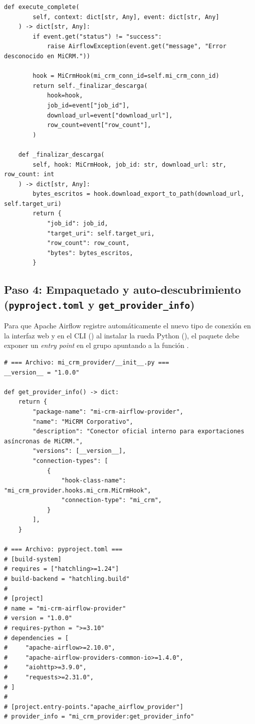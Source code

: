 \begin{lstlisting}[style=python, caption={Operador diferible (\texttt{mi\_crm\_provider/operators/mi\_crm.py}).}, label={lst:custom-operator}]
    def execute_complete(
        self, context: dict[str, Any], event: dict[str, Any]
    ) -> dict[str, Any]:
        if event.get("status") != "success":
            raise AirflowException(event.get("message", "Error desconocido en MiCRM."))

        hook = MiCrmHook(mi_crm_conn_id=self.mi_crm_conn_id)
        return self._finalizar_descarga(
            hook=hook,
            job_id=event["job_id"],
            download_url=event["download_url"],
            row_count=event["row_count"],
        )

    def _finalizar_descarga(
        self, hook: MiCrmHook, job_id: str, download_url: str, row_count: int
    ) -> dict[str, Any]:
        bytes_escritos = hook.download_export_to_path(download_url, self.target_uri)
        return {
            "job_id": job_id,
            "target_uri": self.target_uri,
            "row_count": row_count,
            "bytes": bytes_escritos,
        }
\end{lstlisting}

\subsection{Paso 4: Empaquetado y auto-descubrimiento (\texttt{pyproject.toml} y \texttt{get\_provider\_info})}

Para que Apache Airflow registre automáticamente el nuevo tipo de conexión  en la interfaz web y en el CLI () al instalar la rueda Python (), el paquete debe exponer un \textit{entry point} en el grupo  apuntando a la función .

\begin{lstlisting}[style=python, caption={Registro del proveedor (\texttt{mi\_crm\_provider/\_\_init\_\_.py}) y manifiesto \texttt{pyproject.toml}.}, label={lst:custom-packaging}]
# === Archivo: mi_crm_provider/__init__.py ===
__version__ = "1.0.0"

def get_provider_info() -> dict:
    return {
        "package-name": "mi-crm-airflow-provider",
        "name": "MiCRM Corporativo",
        "description": "Conector oficial interno para exportaciones asíncronas de MiCRM.",
        "versions": [__version__],
        "connection-types": [
            {
                "hook-class-name": "mi_crm_provider.hooks.mi_crm.MiCrmHook",
                "connection-type": "mi_crm",
            }
        ],
    }

# === Archivo: pyproject.toml ===
# [build-system]
# requires = ["hatchling>=1.24"]
# build-backend = "hatchling.build"
#
# [project]
# name = "mi-crm-airflow-provider"
# version = "1.0.0"
# requires-python = ">=3.10"
# dependencies = [
#     "apache-airflow>=2.10.0",
#     "apache-airflow-providers-common-io>=1.4.0",
#     "aiohttp>=3.9.0",
#     "requests>=2.31.0",
# ]
#
# [project.entry-points."apache_airflow_provider"]
# provider_info = "mi_crm_provider:get_provider_info"
\end{lstlisting}

